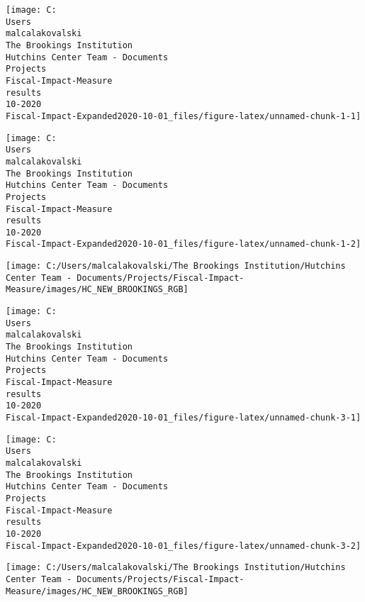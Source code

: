 \documentclass[
  9pt,
]{article}
\author{}
\date{\vspace{-2.5em}}
\begin{document}

\begin{center}\texttt{[image: C:\\Users\\malcalakovalski\\The Brookings Institution\\Hutchins Center Team - Documents\\Projects\\Fiscal-Impact-Measure\\results\\10-2020\\Fiscal-Impact-Expanded2020-10-01\_files/figure-latex/unnamed-chunk-1-1]} \end{center}

\begin{center}\texttt{[image: C:\\Users\\malcalakovalski\\The Brookings Institution\\Hutchins Center Team - Documents\\Projects\\Fiscal-Impact-Measure\\results\\10-2020\\Fiscal-Impact-Expanded2020-10-01\_files/figure-latex/unnamed-chunk-1-2]} \end{center}

\begin{flushright}\texttt{[image: C:/Users/malcalakovalski/The Brookings Institution/Hutchins Center Team - Documents/Projects/Fiscal-Impact-Measure/images/HC\_NEW\_BROOKINGS\_RGB]} \end{flushright}

\pagebreak

\begin{center}\texttt{[image: C:\\Users\\malcalakovalski\\The Brookings Institution\\Hutchins Center Team - Documents\\Projects\\Fiscal-Impact-Measure\\results\\10-2020\\Fiscal-Impact-Expanded2020-10-01\_files/figure-latex/unnamed-chunk-3-1]} \end{center}

\begin{center}\texttt{[image: C:\\Users\\malcalakovalski\\The Brookings Institution\\Hutchins Center Team - Documents\\Projects\\Fiscal-Impact-Measure\\results\\10-2020\\Fiscal-Impact-Expanded2020-10-01\_files/figure-latex/unnamed-chunk-3-2]} \end{center}

\begin{flushright}\texttt{[image: C:/Users/malcalakovalski/The Brookings Institution/Hutchins Center Team - Documents/Projects/Fiscal-Impact-Measure/images/HC\_NEW\_BROOKINGS\_RGB]} \end{flushright}
\end{document}
